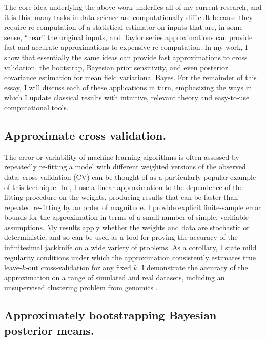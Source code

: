 The core idea underlying the above work underlies all of my current research,
and it is this: many tasks in data science are computationally difficult because
they require re-computation of a statistical estimator on inputs that are, in
some sense, ``near'' the original inputs, and Taylor series approximations can
provide fast and accurate approximations to expensive re-computation.  In my
work, I show that essentially the same ideas can provide fast approximations to
cross validation, the bootstrap, Bayesian prior sensitivity, and even posterior
covariance estimation for mean field variational Bayes.  For the remainder
of this essay, I will discuss each of these applications in turn, emphasizing
the ways in which I update classical results with intuitive, relevant theory
and easy-to-use computational tools.


\newpage

\subsection*{Approximate cross validation.}

The error or variability of machine learning algorithms is often assessed by
repeatedly re-fitting a model with different weighted versions of the observed
data; cross-validation (CV) can be thought of as a particularly popular example
of this technique.
%
In \citet{giordano:2019:ij}, I use a linear approximation to the
dependence of the fitting procedure on the weights, producing results that can
be faster than repeated re-fitting by an order of magnitude. I provide explicit
finite-sample error bounds for the approximation in terms of a small number of
simple, verifiable assumptions.  My results apply whether the weights and data
are stochastic or deterministic, and so can be used as a tool for proving the
accuracy of the infinitesimal jackknife on a wide variety of problems. As a
corollary, I state mild regularity conditions under which the approximation
consistently estimates true leave-$k$-out cross-validation for any fixed $k$. I
demonstrate the accuracy of the approximation on a range of simulated and real
datasets, including an unsupervised clustering problem from genomics
\citep{Luan:2003:clustering, shoemaker:2015:ultrasensitive}.




\subsection*{Approximately bootstrapping Bayesian posterior means.}


